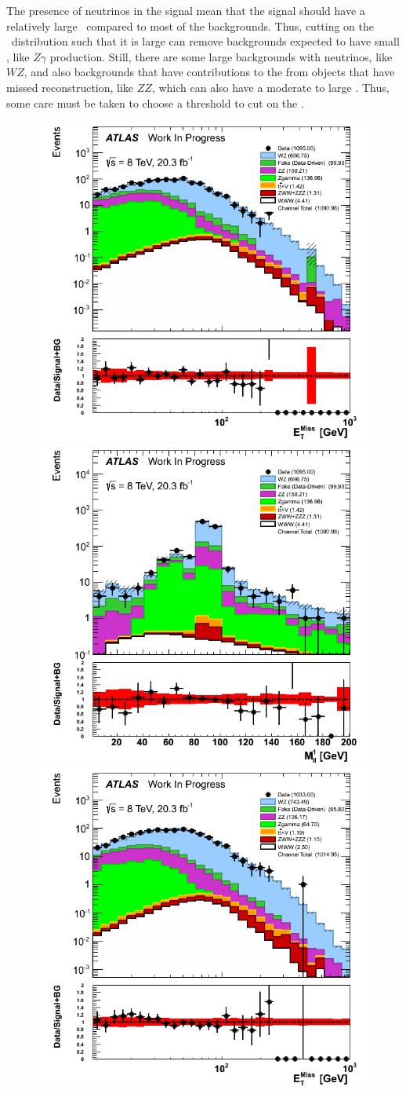 The presence of neutrinos in the signal mean that the signal should have a 
relatively large \MET~compared to most of the backgrounds. Thus, 
cutting on the \MET~distribution such that it is large can remove backgrounds
expected to have small \MET, like $Z\gamma$ production.
Still, there are some large backgrounds with neutrinos, like $WZ$, 
and also backgrounds that have contributions to the \MET from objects that have
missed reconstruction, like $ZZ$, which can also have a moderate to large \MET.
Thus, some care must be taken to choose a threshold to cut on the \MET.

\begin{figure}[ht!]
\centering
\includegraphics[width=0.4\columnwidth]{figures/appendix_signal_selection/Nov24Update_FakeSys_KFacSys_LogY_NoRebin/output/jobs/MxM/DataFull_Rates_May13_FakeRatesExactly2Loose_MuonMxMBJetGt0_ElBJetGt0SubtractPC_MxM/PreselectionNov23_15_1SFOS_ChargeAbs1_BVeto85_physics/weight_all/png/MET_Et_histratio.png}
\includegraphics[width=0.4\columnwidth]{figures/appendix_signal_selection/Nov24Update_FakeSys_KFacSys_LogY_NoRebin/output/jobs/MxM/DataFull_Rates_May13_FakeRatesExactly2Loose_MuonMxMBJetGt0_ElBJetGt0SubtractPC_MxM/PreselectionNov23_15_1SFOS_ChargeAbs1_BVeto85_physics/weight_all/png/InvariantMassSFOS_histratio.png}
\includegraphics[width=0.4\columnwidth]{figures/appendix_signal_selection/Nov24Update_FakeSys_KFacSys_LogY_NoRebin/output/jobs/MxM/DataFull_Rates_May13_FakeRatesExactly2Loose_MuonMxMBJetGt0_ElBJetGt0SubtractPC_MxM/PreselectionNov23_15_2SFOS_ChargeAbs1_BVeto85_physics/weight_all/png/MET_Et_histratio.png}

\end{figure}
